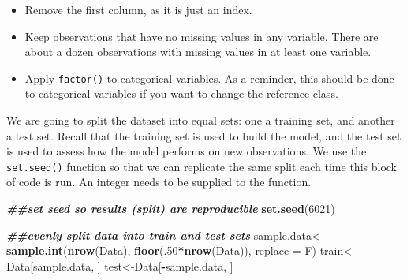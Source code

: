 \documentclass[
]{book}
\newenvironment{Shaded}{\begin{snugshade}}{\end{snugshade}}
\newcommand{\AttributeTok}[1]{\textcolor[rgb]{0.13,0.29,0.53}{#1}}
\newcommand{\DecValTok}[1]{\textcolor[rgb]{0.00,0.00,0.81}{#1}}
\newcommand{\DocumentationTok}[1]{\textcolor[rgb]{0.56,0.35,0.01}{\textbf{\textit{#1}}}}
\newcommand{\FunctionTok}[1]{\textcolor[rgb]{0.13,0.29,0.53}{\textbf{#1}}}
\newcommand{\NormalTok}[1]{#1}
\newcommand{\OtherTok}[1]{\textcolor[rgb]{0.56,0.35,0.01}{#1}}
\newcommand{\SpecialCharTok}[1]{\textcolor[rgb]{0.81,0.36,0.00}{\textbf{#1}}}
\providecommand{\tightlist}{%
  \setlength{\itemsep}{0pt}\setlength{\parskip}{0pt}}
\begin{document}
\begin{itemize}
\tightlist
\item
  Remove the first column, as it is just an index.
\item
  Keep observations that have no missing values in any variable. There are about a dozen observations with missing values in at least one variable.
\item
  Apply \texttt{factor()} to categorical variables. As a reminder, this should be done to categorical variables if you want to change the reference class.
\end{itemize}

\begin{Shaded}
\end{Shaded}

We are going to split the dataset into equal sets: one a training set, and another a test set. Recall that the training set is used to build the model, and the test set is used to assess how the model performs on new observations. We use the \texttt{set.seed()} function so that we can replicate the same split each time this block of code is run. An integer needs to be supplied to the function.

\begin{Shaded}
\begin{Highlighting}[]
\DocumentationTok{\#\#set seed so results (split) are reproducible}
\FunctionTok{set.seed}\NormalTok{(}\DecValTok{6021}\NormalTok{)}

\DocumentationTok{\#\#evenly split data into train and test sets}
\NormalTok{sample.data}\OtherTok{\textless{}{-}}\FunctionTok{sample.int}\NormalTok{(}\FunctionTok{nrow}\NormalTok{(Data), }\FunctionTok{floor}\NormalTok{(.}\DecValTok{50}\SpecialCharTok{*}\FunctionTok{nrow}\NormalTok{(Data)), }\AttributeTok{replace =}\NormalTok{ F)}
\NormalTok{train}\OtherTok{\textless{}{-}}\NormalTok{Data[sample.data, ]}
\NormalTok{test}\OtherTok{\textless{}{-}}\NormalTok{Data[}\SpecialCharTok{{-}}\NormalTok{sample.data, ]}
\end{Highlighting}
\end{Shaded}
\end{document}
